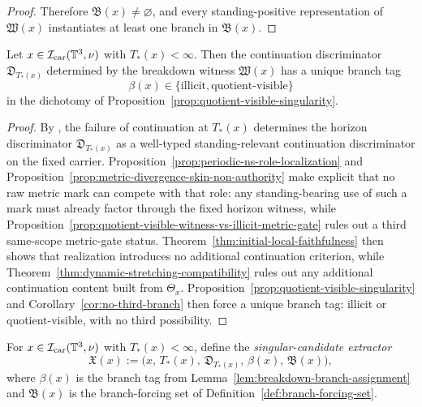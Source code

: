 \begin{proof}
Therefore $\mathfrak B(x)\neq\varnothing$, and every standing-positive representation of
$\mathfrak W(x)$ instantiates at least one branch in $\mathfrak B(x)$.
\end{proof}

\begin{lemma}\label{lem:breakdown-branch-assignment}
Let $x\in\mathcal I_{\mathrm{car}}(\mathbb{T}^3,\nu)$ with $T_*(x)<\infty$. Then the continuation discriminator
$\mathfrak D_{T_*(x)}$ determined by the breakdown witness $\mathfrak W(x)$ has a unique branch tag
\[
\beta(x)\in\{\mathrm{illicit},\mathrm{quotient\mbox{-}visible}\}
\]
in the dichotomy of Proposition~\ref{prop:quotient-visible-singularity}.
\end{lemma}

\begin{proof}
By \HorizonDetectabilityRef{}, the failure of continuation at $T_*(x)$ determines the horizon discriminator $\mathfrak D_{T_*(x)}$ as a well-typed standing-relevant continuation discriminator on the fixed carrier. Proposition~\ref{prop:periodic-ns-role-localization} and Proposition~\ref{prop:metric-divergence-skin-non-authority} make explicit that no raw metric mark can compete with that role: any standing-bearing use of such a mark must already factor through the fixed horizon witness, while Proposition~\ref{prop:quotient-visible-witness-vs-illicit-metric-gate} rules out a third same-scope metric-gate status. Theorem~\ref{thm:initial-local-faithfulness} then shows that realization introduces no additional continuation criterion, while Theorem~\ref{thm:dynamic-stretching-compatibility} rules out any additional continuation content built from $\Theta_x$. Proposition~\ref{prop:quotient-visible-singularity} and Corollary~\ref{cor:no-third-branch}
then force a unique branch tag: illicit or quotient-visible, with no third possibility.
\end{proof}

\begin{definition}\label{def:singular-candidate-extractor}
For $x\in\mathcal I_{\mathrm{car}}(\mathbb{T}^3,\nu)$ with $T_*(x)<\infty$, define the \emph{singular-candidate extractor}
\[
\mathfrak X(x):=\bigl(x,\,T_*(x),\,\mathfrak D_{T_*(x)},\,\beta(x),\,\mathfrak B(x)\bigr),
\]
where $\beta(x)$ is the branch tag from Lemma~\ref{lem:breakdown-branch-assignment} and
$\mathfrak B(x)$ is the branch-forcing set of Definition~\ref{def:branch-forcing-set}.
\end{definition}

